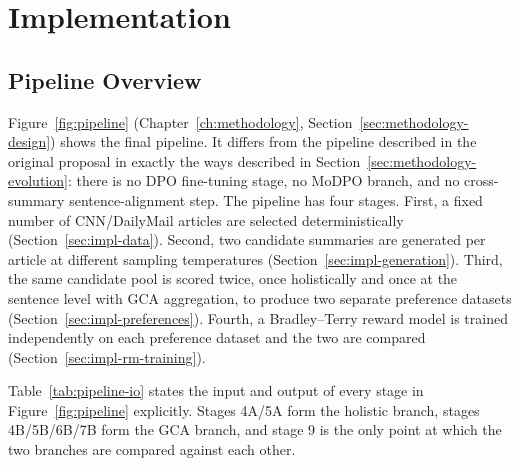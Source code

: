 \chapter{Implementation}
\label{ch:implementation}

\section{Pipeline Overview}
\label{sec:impl-pipeline}

Figure~\ref{fig:pipeline} (Chapter~\ref{ch:methodology},
Section~\ref{sec:methodology-design}) shows the final pipeline. It differs
from the pipeline described in the original proposal in exactly the ways
described in Section~\ref{sec:methodology-evolution}: there is no DPO
fine-tuning stage, no MoDPO \citep{zhou2024modpo} branch, and no
cross-summary sentence-alignment step. The pipeline has four stages. First,
a fixed number of CNN/DailyMail articles are selected deterministically
(Section~\ref{sec:impl-data}). Second, two candidate summaries are generated per
article at different sampling temperatures (Section~\ref{sec:impl-generation}).
Third, the same candidate pool is scored twice, once holistically and once at the
sentence level with GCA aggregation, to produce two separate preference datasets
(Section~\ref{sec:impl-preferences}). Fourth, a Bradley--Terry reward model is
trained independently on each preference dataset and the two are compared
(Section~\ref{sec:impl-rm-training}).

Table~\ref{tab:pipeline-io} states the input and output of every stage in
Figure~\ref{fig:pipeline} explicitly. Stages 4A/5A form the holistic branch,
stages 4B/5B/6B/7B form the GCA branch, and stage 9 is the only point at
which the two branches are compared against each other.


